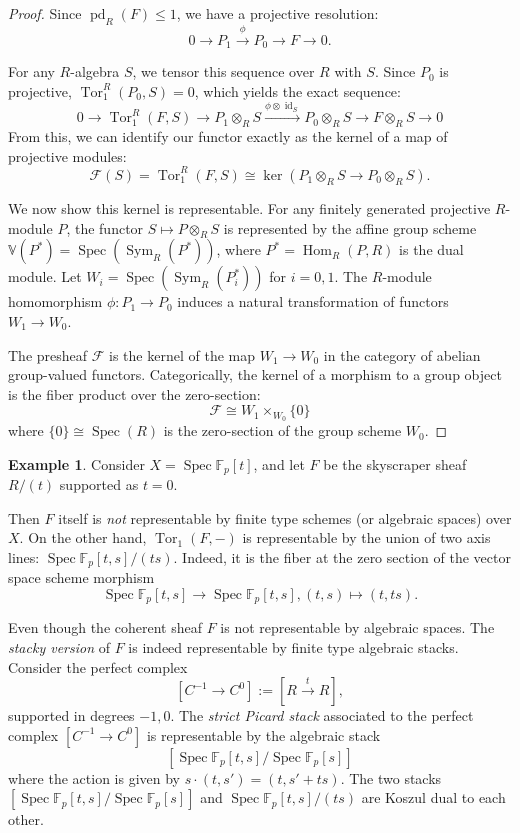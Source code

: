 \documentclass[11pt]{amsart}
\newcommand{\MINOREDITED}[1]{#1}
\theoremstyle{definition}
\newtheorem{example}[thm]{Example}
\newcommand{\F}{\mathbb{F}}
\DeclareMathOperator{\Spec}{Spec}
\DeclareMathOperator{\Tor}{Tor}
\begin{document}
\begin{proof}
Since $\operatorname{pd}_R(F) \le 1$, we have a projective resolution:
$$ 0 \to P_1 \xrightarrow{\phi} P_0 \to F \to 0. $$

For any $R$-algebra $S$, we tensor this sequence over $R$ with $S$. Since $P_0$ is projective, $\operatorname{Tor}_1^R(P_0, S) = 0$, which yields the exact sequence:
$$ 0 \to \operatorname{Tor}_1^R(F, S) \to P_1 \otimes_R S \xrightarrow{\phi \otimes \operatorname{id}_S} P_0 \otimes_R S \to F \otimes_R S \to 0 $$
From this, we can identify our functor exactly as the kernel of a map of projective modules:
$$ \mathcal{F}(S) = \operatorname{Tor}_1^R(F, S) \cong \ker(P_1 \otimes_R S \to P_0 \otimes_R S). $$

We now show this kernel is representable. For any finitely generated projective $R$-module $P$, the functor $S \mapsto P \otimes_R S$ is represented by the affine group scheme $\mathbb{V}(P^*) = \operatorname{Spec}(\operatorname{Sym}_R(P^*))$, where $P^* = \operatorname{Hom}_R(P, R)$ is the dual module.
Let $W_i = \operatorname{Spec}(\operatorname{Sym}_R(P_i^*))$ for $i = 0, 1$. The $R$-module homomorphism $\phi: P_1 \to P_0$ induces a natural transformation of functors $W_1 \to W_0$.

The presheaf $\mathcal{F}$ is the kernel of the map $W_1 \to W_0$ in the category of abelian group-valued functors. Categorically, the kernel of a morphism to a group object is the fiber product over the zero-section:
$$ \mathcal{F} \cong W_1 \times_{W_0} \{0\} $$
where $\{0\} \cong \operatorname{Spec}(R)$ is the zero-section of the group scheme $W_0$. 
\end{proof}

\begin{example}
Consider $X=\Spec \F_p[t]$,
and let $F$ be the skyscraper sheaf
$R/(t)$ supported as $t=0$.

Then $F$ itself is {\it not} representable
by finite type schemes (or algebraic spaces)
over $X$.
On the other hand, $\Tor_1(F,-)$
is representable by
the union of two axis lines:
$\Spec \F_p[t,s]/(ts)$.
Indeed, it is the fiber at the zero section
of the vector space scheme morphism
\[
\Spec \F_p[t,s] \to \Spec \F_p[t,s],
(t,s)\mapsto \MINOREDITED{(t,ts)}.
\]

Even though the coherent sheaf $F$ is not representable
by algebraic spaces.
The {\it stacky version} of $F$
is indeed representable
by finite type algebraic stacks.
Consider the perfect complex
\[
[C^{-1}\to C^0]:=[R\xrightarrow{t} R],
\]
supported in degrees $-1,0$.
The {\it strict Picard stack}
associated to the perfect complex $[C^{-1}\to C^0]$
is representable by the algebraic stack
\[
[\Spec \F_p[t,s]/\Spec \F_p[s]]
\]
where the action is given by $s\cdot(t, s')=(t,s'+ts)$.
The two stacks $[\Spec \F_p[t,s]/\Spec \F_p[s]]$
and $\Spec \F_p[t,s]/(ts)$
are Koszul dual to each other.
\label{ex:strict-picard}
\end{example}
\end{document}
